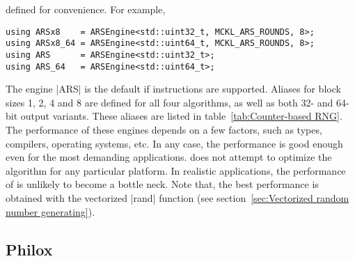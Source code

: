 defined for convenience. For example,
\begin{Verbatim}
using ARSx8    = ARSEngine<std::uint32_t, MCKL_ARS_ROUNDS, 8>;
using ARSx8_64 = ARSEngine<std::uint64_t, MCKL_ARS_ROUNDS, 8>;
using ARS      = ARSEngine<std::uint32_t>;
using ARS_64   = ARSEngine<std::uint64_t>;
\end{Verbatim}
The engine |ARS| is the default \rng if \aesni instructions are supported.
Aliases for block sizes 1, 2, 4 and 8 are defined for all four algorithms, as
well as both 32- and 64-bit output variants. These aliases are listed in
table~\ref{tab:Counter-based RNG}. The performance of these engines depends on
a few factors, such as \cpu types, compilers, operating systems, etc. In any
case, the performance is good enough even for the most demanding applications.
\mckl does not attempt to optimize the algorithm for any particular platform.
In realistic applications, the performance of \rng is unlikely to become a
bottle neck. Note that, the best performance is obtained with the vectorized
|rand| function (see section~\ref{sec:Vectorized random number generating}).

\subsection{Philox}
\label{sub:Philox}

